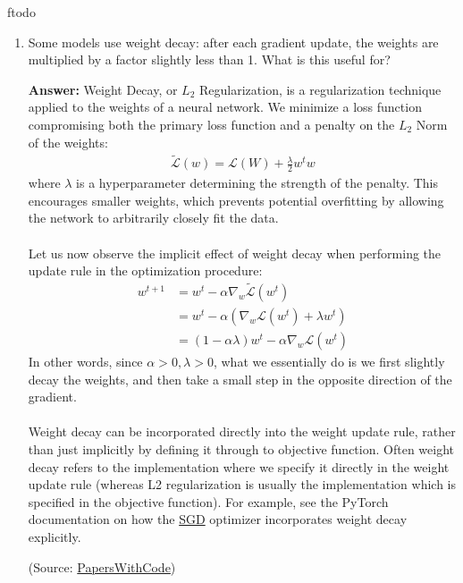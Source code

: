 ƒtodo\documentclass{article}
\newenvironment{QandA}{\begin{enumerate}[label=\arabic*.]}{\end{enumerate}}
\newenvironment{answer}{\par\normalfont \textbf{Answer:}}{}
\begin{document}
\begin{QandA}
    \item Some models use weight decay: after each gradient update, the weights are multiplied by a factor slightly less than 1. What is this useful for?
    \begin{answer}
        Weight Decay, or $L_2$ Regularization, is a regularization technique applied to the weights of a neural network. We minimize a loss function compromising both the primary loss function and a penalty on the $L_2$ Norm of the weights:
        \begin{align*}
            \tilde{\mathcal{L}}(w) = \mathcal{L}(W) + \frac{\lambda}{2} w^t w
        \end{align*}
        where $\lambda$ is a hyperparameter determining the strength of the penalty. This encourages smaller weights, which prevents potential overfitting by allowing the network to arbitrarily closely fit the data. \\\\
        Let us now observe the implicit effect of weight decay when performing the update rule in the optimization procedure:
        \begin{align*}
            w^{t+1} &= w^t - \alpha \nabla_w \tilde{\mathcal{L}}(w^t) \\
            &= w^t - \alpha(\nabla_w \mathcal{L}(w^t) + \lambda w^t) \\
            &= (1 - \alpha \lambda)w^t - \alpha \nabla_w \mathcal{L}(w^t)
        \end{align*}
        In other words, since $\alpha > 0, \lambda > 0$, what we essentially do is we first slightly decay the weights, and then take a small step in the opposite direction of the gradient. \\\\
        Weight decay can be incorporated directly into the weight update rule, rather than just implicitly by defining it through to objective function. Often weight decay refers to the implementation where we specify it directly in the weight update rule (whereas L2 regularization is usually the implementation which is specified in the objective function). For example, see the PyTorch documentation on how the \href{https://pytorch.org/docs/stable/\lagenerated/torch.optim.SGD.html}{SGD} optimizer incorporates weight decay explicitly. 

        (Source: \href{https://paperswithcode.com/method/weight-decay}{PapersWithCode})
    \end{answer}    


\end{QandA}
\end{document}
